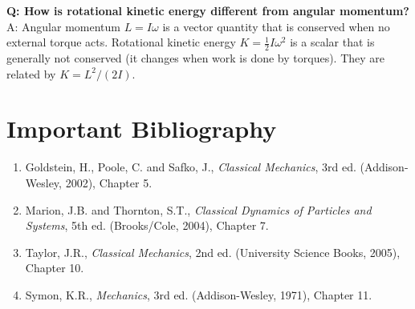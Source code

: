 \textbf{Q: How is rotational kinetic energy different from angular momentum?}
A: Angular momentum $L = I\omega$ is a vector quantity that is conserved when no external torque acts. Rotational kinetic energy $K = \frac{1}{2}I\omega^2$ is a scalar that is generally not conserved (it changes when work is done by torques). They are related by $K = L^2/(2I)$.
\section*{Important Bibliography}

\begin{enumerate}
\item Goldstein, H., Poole, C. and Safko, J., \textit{Classical Mechanics}, 3rd ed. (Addison-Wesley, 2002), Chapter 5.
\item Marion, J.B. and Thornton, S.T., \textit{Classical Dynamics of Particles and Systems}, 5th ed. (Brooks/Cole, 2004), Chapter 7.
\item Taylor, J.R., \textit{Classical Mechanics}, 2nd ed. (University Science Books, 2005), Chapter 10.
\item Symon, K.R., \textit{Mechanics}, 3rd ed. (Addison-Wesley, 1971), Chapter 11.
\end{enumerate}



